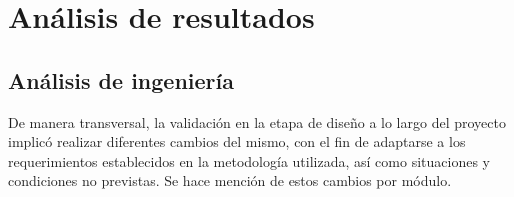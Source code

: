 \chapter{Análisis de resultados}

\section{Análisis de ingeniería}
De manera transversal, la validación en la etapa de diseño a lo largo del proyecto implicó realizar diferentes cambios del mismo, con el fin de adaptarse a los requerimientos establecidos en la metodología utilizada, así como situaciones y condiciones no previstas. Se hace mención de estos cambios por módulo.

